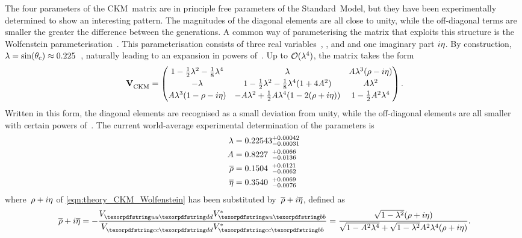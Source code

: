 The four parameters of the CKM~matrix are in principle free parameters of the Standard~Model, but they have been experimentally determined to show an interesting pattern.
The magnitudes of the diagonal elements are all close to unity, while the off-diagonal terms are smaller the greater the difference between the generations.
A common way of parameterising the matrix that exploits this structure is the Wolfenstein parameterisation~\cite{Wolfenstein:1983yz}.
This parameterisation consists of three real variables~\wolfl, \wolfA, and \wolfrho and one imaginary part \({i\eta}\).
By construction, \({\lambda = \sin(\theta_{\text{c}}) \approx 0.225}\)~\cite{CKM1}, naturally leading to an expansion in powers of~\wolfl.
Up to \({{\mathcal{O}}(\lambda^{4})}\), the matrix takes the form
%
\begin{equation} \label{eqn:theory_CKM_Wolfenstein}
    \VCKM
    =
    \begin{pmatrix}
        1 - \frac{1}{2}\wolfl^{2} - \frac{1}{8}\wolfl^{4} & \wolfl & \wolfA\wolfl^{3}(\wolfrho - i\wolfeta) \\[.5ex]
        -\wolfl & 1 - \frac{1}{2}\wolfl^{2} - \frac{1}{8}\wolfl^{4}(1 + 4\wolfA^{2}) & \wolfA\wolfl^{2} \\[.5ex]
        \wolfA\wolfl^{3} (1 - \wolfrho - i\wolfeta) & -\wolfA\wolfl^{2} + \frac{1}{2}\wolfA\wolfl^{4}(1 - 2(\wolfrho + i\wolfeta)) & 1 - \frac{1}{2}\wolfA^{2}\wolfl^{4}
    \end{pmatrix} \rlap{.}
\end{equation}
%
Written in this form, the diagonal elements are recognised as a small deviation from unity, while the off-diagonal elements are all smaller with certain powers of~\wolfl.
The current world-average experimental determination of the parameters is~\cite{HFLAV2016}
%
\begin{subequations}
    \begin{align}
        \wolfl    &= {0.22543 }_{-0.00031}^{+0.00042} \\
        \wolfA    &= {0.8227\0}_{-0.0136}^{+0.0066} \\
        \wolfrhob &= {0.1504\0}_{-0.0062}^{+0.0121} \\
        \wolfetab &= {0.3540\0}_{-0.0076}^{+0.0069}
    \end{align}
\end{subequations}
%
where~\({\rho + i\eta}\) of \cref{eqn:theory_CKM_Wolfenstein} has been substituted by~\({\overline{\rho} + i\overline{\eta}}\), defined as
%
\begin{equation} \label{eqn:theory_CKM_rhob_etab}
    \wolfrhob + i\wolfetab = -\dfrac{\Vud\Vubs}{\Vcd\Vcbs} = \dfrac{\sqrt{1-\wolfl^{2}} (\wolfrho + i\wolfeta)}{\sqrt{1 - \wolfA^{2}\wolfl^{4}} + \sqrt{1 - \wolfl^{2}}\wolfA^{2}\wolfl^{4}(\wolfrho + i\wolfeta)} \rlap{.}
\end{equation}

